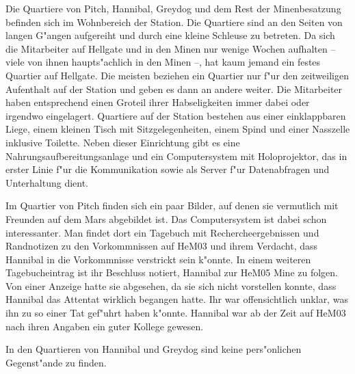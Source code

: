 
Die Quartiere von Pitch, Hannibal, Greydog und dem Rest der Minenbesatzung befinden sich im Wohnbereich der Station. Die Quartiere sind an den Seiten von langen G"angen aufgereiht und durch eine kleine Schleuse zu betreten. Da sich die Mitarbeiter auf Hellgate und in den Minen nur wenige Wochen aufhalten -- viele von ihnen haupts"achlich in den Minen --, hat kaum jemand ein festes Quartier auf Hellgate. Die meisten beziehen ein Quartier nur f"ur den zeitweiligen Aufenthalt auf der Station und geben es dann an andere weiter. Die Mitarbeiter haben entsprechend einen Gro\3teil ihrer Habseligkeiten immer dabei oder irgendwo eingelagert. Quartiere auf der Station bestehen aus einer einklappbaren Liege, einem kleinen Tisch mit Sitzgelegenheiten, einem Spind und einer Nasszelle inklusive Toilette. Neben dieser Einrichtung gibt es eine Nahrungsaufbereitungsanlage und ein Computersystem mit Holoprojektor, das in erster Linie f"ur die Kommunikation sowie als Server f"ur Datenabfragen und Unterhaltung dient.

Im Quartier von Pitch finden sich ein paar Bilder, auf denen sie vermutlich mit Freunden auf dem Mars abgebildet ist. Das Computersystem ist dabei schon interessanter. Man findet dort ein Tagebuch mit Rechercheergebnissen und Randnotizen zu den Vorkommnissen auf HeM03 und ihrem Verdacht, dass Hannibal in die Vorkommnisse verstrickt sein k"onnte. In einem weiteren Tagebucheintrag ist ihr Beschluss notiert, Hannibal zur HeM05 Mine zu folgen. Von einer Anzeige hatte sie abgesehen, da sie sich nicht vorstellen konnte, dass Hannibal das Attentat wirklich begangen hatte. Ihr war offensichtlich unklar, was ihn zu so einer Tat gef"uhrt haben k"onnte. Hannibal war ab der Zeit auf HeM03 nach ihren Angaben ein guter Kollege gewesen.

In den Quartieren von Hannibal und Greydog sind keine pers"onlichen Gegenst"ande zu finden.

